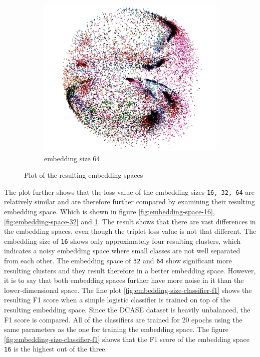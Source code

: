 \begin{figure}[t]
\begin{subfigure}{.33\linewidth}
  \includegraphics[width=.9\linewidth]{study-doc/experiment_embedding_size/assets/embedding_space_64.png}
  \caption{embedding size 64}
  \label{fig:embedding-space-64}
\end{subfigure}
\caption{Plot of the resulting embedding spaces}
\label{fig:embedding-size-experiment-embedding-space}
\end{figure}
\newline
\newline
\noindent
The plot further shows that the loss value of the embedding sizes \texttt{16, 32, 64} are relatively similar and are therefore further compared by examining their resulting embedding space. Which is shown in figure \ref{fig:embedding-space-16}, \ref{fig:embedding-space-32} and \ref{fig:embedding-space-64}. The result shows that there are vast differences in the embedding spaces, even though the triplet loss value is not that different. The embedding size of \texttt{16} shows only approximately four resulting clusters, which indicates a noisy embedding space where small classes are not well separated from each other. The embedding space of \texttt{32} and \texttt{64} show significant more resulting clusters and they result therefore in a better embedding space. However, it is to say that both embedding spaces further have more noise in it than the lower-dimensional space.
\newline
\newline
The line plot \ref{fig:embedding-size-classifier-f1} shows the resulting F1 score when a simple logistic classifier is trained on top of the resulting embedding space. Since the DCASE dataset is heavily unbalanced, the F1 score is compared. All of the classifiers are trained for 20 epochs using the same parameters as the one for training the embedding space. The figure \ref{fig:embedding-size-classifier-f1} shows that the F1 score of the embedding space \texttt{16} is the highest out of the three.
